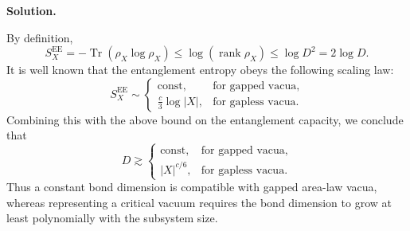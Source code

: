 \documentclass[11pt,a4paper]{article}
\newcounter{problem}
\newcounter{saveequation}
\newenvironment{solution}
{
	\par
	\setcounter{saveequation}{\value{equation}}
	\begingroup
	\setcounter{equation}{0}
	\renewcommand{\theequation}{\arabic{problem}.\arabic{equation}}
	\renewcommand{\theHequation}{sol.\arabic{problem}.\arabic{equation}}
	\noindent\textbf{Solution.}\quad
}
{
	\par
	\endgroup
	\setcounter{equation}{\value{saveequation}}
}
\begin{document}
\begin{solution}
\[		\]
		By definition,
		\[
		S^{\mathrm{EE}}_X
		=
		-\operatorname{Tr}\left(\rho_X\log\rho_X\right)
		\leq
		\log(\operatorname{rank}\rho_X)
		\leq
		\log D^2
		=
		2\log D.
		\]
		It is well known that the entanglement entropy obeys the following scaling law:
		\[
		S^{\mathrm{EE}}_{X}
		\sim
		\begin{cases}
			\mathrm{const}, & \text{for gapped vacua},\\ 
			\frac{c}{3}\log|X|, & \text{for gapless vacua}.
		\end{cases}
		\]
		Combining this with the above bound on the entanglement capacity, we conclude that
		\[
		D\gtrsim
		\begin{cases}
			\mathrm{const}, & \text{for gapped vacua},\\ 
			|X|^{c/6}, & \text{for gapless vacua}.
		\end{cases}
		\]
		Thus a constant bond dimension is compatible with gapped area-law
		vacua, whereas representing a critical vacuum requires the bond
		dimension to grow at least polynomially with the subsystem size.
	\end{solution}
\end{document}
